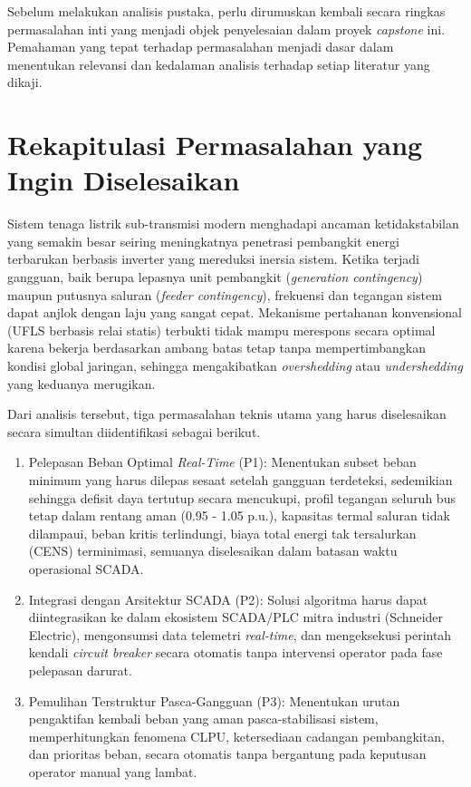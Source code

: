 Sebelum melakukan analisis pustaka, perlu dirumuskan kembali secara ringkas permasalahan inti yang menjadi objek penyelesaian dalam proyek \textit{capstone} ini. Pemahaman yang tepat terhadap permasalahan menjadi dasar dalam menentukan relevansi dan kedalaman analisis terhadap setiap literatur yang dikaji.

\section{Rekapitulasi Permasalahan yang Ingin Diselesaikan}
\label{sec:Rekapitulasi_Permasalahan}

Sistem tenaga listrik sub-transmisi modern menghadapi ancaman ketidakstabilan yang semakin besar seiring meningkatnya penetrasi pembangkit energi terbarukan berbasis inverter yang mereduksi inersia sistem. Ketika terjadi gangguan, baik berupa lepasnya unit pembangkit (\textit{generation contingency}) maupun putusnya saluran (\textit{feeder contingency}), frekuensi dan tegangan sistem dapat anjlok dengan laju yang sangat cepat. Mekanisme pertahanan konvensional (UFLS berbasis relai statis) terbukti tidak mampu merespons secara optimal karena bekerja berdasarkan ambang batas tetap tanpa mempertimbangkan kondisi global jaringan, sehingga mengakibatkan \textit{overshedding} atau \textit{undershedding} yang keduanya merugikan.

Dari analisis tersebut, tiga permasalahan teknis utama yang harus diselesaikan secara simultan diidentifikasi sebagai berikut.

\begin{enumerate}
    \item[a.] Pelepasan Beban Optimal \textit{Real-Time} (P1): Menentukan subset beban minimum yang harus dilepas sesaat setelah gangguan terdeteksi, sedemikian sehingga defisit daya tertutup secara mencukupi, profil tegangan seluruh bus tetap dalam rentang aman (0.95 - 1.05 p.u.), kapasitas termal saluran tidak dilampaui, beban kritis terlindungi, biaya total energi tak tersalurkan (CENS) terminimasi, semuanya diselesaikan dalam batasan waktu operasional SCADA.
    \item[b.] Integrasi dengan Arsitektur SCADA (P2): Solusi algoritma harus dapat diintegrasikan ke dalam ekosistem SCADA/PLC mitra industri (Schneider Electric), mengonsumsi data telemetri \textit{real-time}, dan mengeksekusi perintah kendali \textit{circuit breaker} secara otomatis tanpa intervensi operator pada fase pelepasan darurat.
    \item[c.] Pemulihan Terstruktur Pasca-Gangguan (P3): Menentukan urutan pengaktifan kembali beban yang aman pasca-stabilisasi sistem, memperhitungkan fenomena CLPU, ketersediaan cadangan pembangkitan, dan prioritas beban, secara otomatis tanpa bergantung pada keputusan operator manual yang lambat.
\end{enumerate}

